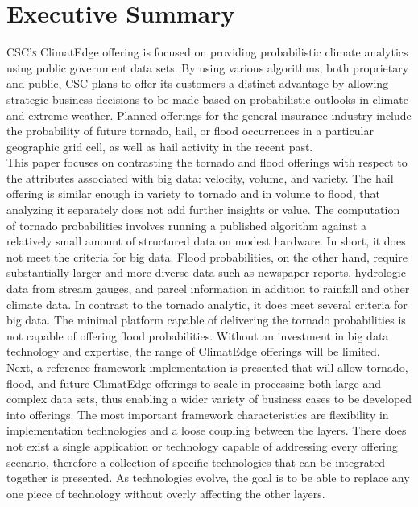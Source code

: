 \section{Executive Summary}
\textsc{CSC's} ClimatEdge\texttrademark{} offering is focused on providing probabilistic climate analytics using public government data sets. By using various algorithms, both proprietary and public, \textsc{CSC} plans to offer its customers a distinct advantage by allowing strategic business decisions to be made based on probabilistic outlooks in climate and extreme weather. Planned offerings for the general insurance industry include the probability of future tornado, hail, or flood occurrences in a particular geographic grid cell, as well as hail activity in the recent past.\\

This paper focuses on contrasting the tornado and flood offerings with respect to the attributes associated with big data: velocity, volume, and variety. The hail offering is similar enough in variety to tornado and in volume to flood, that analyzing it separately does not add further insights or value. The computation of tornado probabilities involves running a published algorithm against a relatively small amount of structured data on modest hardware. In short, it does not meet the criteria for big data. Flood probabilities, on the other hand, require substantially larger and more diverse data such as newspaper reports, hydrologic data from stream gauges, and parcel information in addition to rainfall and other climate data. In contrast to the tornado analytic, it does meet several criteria for big data. The minimal platform capable of delivering the tornado probabilities is not capable of offering flood probabilities. Without an investment in big data technology and expertise, the range of ClimatEdge offerings will be limited.\\

Next, a reference framework implementation is presented that will allow tornado, flood, and future ClimatEdge offerings to scale in processing both large and complex data sets, thus enabling a wider variety of business cases to be developed into offerings. The most important framework characteristics are flexibility in implementation technologies and a loose coupling between the layers. There does not exist a single application or technology capable of addressing every offering scenario, therefore a collection of specific technologies that can be integrated together is presented. As technologies evolve, the goal is to be able to replace any one piece of technology without overly affecting the other layers.\\

